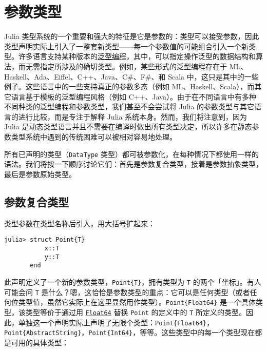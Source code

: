 \hypertarget{1236004098330686506}{}


\section{参数类型}



Julia 类型系统的一个重要和强大的特征是它是参数的：类型可以接受参数，因此类型声明实际上引入了一整套新类型——每一个参数值的可能组合引入一个新类型。许多语言支持某种版本的\href{https://en.wikipedia.org/wiki/Generic\_programming}{泛型编程}，其中，可以指定操作泛型的数据结构和算法，而无需指定所涉及的确切类型。例如，某些形式的泛型编程存在于 ML、Haskell、Ada、Eiffel、C++、Java、C\#、F\#、和 Scala 中，这只是其中的一些例子。这些语言中的一些支持真正的参数多态（例如 ML、Haskell、Scala），而其它语言基于模板的泛型编程风格（例如 C++、Java）。由于在不同语言中有多种不同种类的泛型编程和参数类型，我们甚至不会尝试将 Julia 的参数类型与其它语言的进行比较，而是专注于解释 Julia 系统本身。然而，我们将注意到，因为 Julia 是动态类型语言并且不需要在编译时做出所有类型决定，所以许多在静态参数类型系统中遇到的传统困难可以被相对容易地处理。



所有已声明的类型（\texttt{DataType} 类型）都可被参数化，在每种情况下都使用一样的语法。我们将按一下顺序讨论它们：首先是参数复合类型，接着是参数抽象类型，最后是参数原始类型。



\hypertarget{3401660112009333580}{}


\subsection{参数复合类型}



类型参数在类型名称后引入，用大括号扩起来：




\begin{verbatim}
julia> struct Point{T}
           x::T
           y::T
       end
\end{verbatim}



此声明定义了一个新的参数类型，\texttt{Point\{T\}}，拥有类型为 \texttt{T} 的两个「坐标」。有人可能会问 \texttt{T} 是什么？嗯，这恰恰是参数类型的重点：它可以是任何类型（或者任何位类型值，虽然它实际上在这里显然用作类型）。\texttt{Point\{Float64\}} 是一个具体类型，该类型等价于通过用 \hyperlink{5027751419500983000}{\texttt{Float64}} 替换 \texttt{Point} 的定义中的 \texttt{T} 所定义的类型。因此，单独这一个声明实际上声明了无限个类型：\texttt{Point\{Float64\}}，\texttt{Point\{AbstractString\}}，\texttt{Point\{Int64\}}，等等。这些类型中的每一个类型现在都是可用的具体类型：




